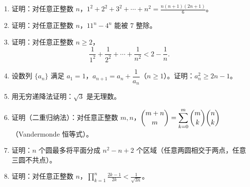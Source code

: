 \documentclass[12pt, a4paper]{ctexart}
\begin{document}
\begin{enumerate}[label=\textbf{题目\arabic*}]

\item 证明：对任意正整数 $n$，$\displaystyle 1^2 + 2^2 + 3^2 + \cdots + n^2 = \frac{n(n+1)(2n+1)}{6}$。

\item 证明：对任意正整数 $n$，$11^n - 4^n$ 能被 $7$ 整除。

\item 证明：对任意正整数 $n \geq 2$，
\[ \frac{1}{1^2} + \frac{1}{2^2} + \cdots + \frac{1}{n^2} < 2 - \frac{1}{n}. \]

\item 设数列 $\{a_n\}$ 满足 $a_1 = 1$，$a_{n+1} = a_n + \dfrac{1}{a_n}$（$n \geq 1$）。证明：$a_n^2 \geq 2n - 1$。

\item 用无穷递降法证明：$\sqrt{3}$ 是无理数。

\item 证明（二重归纳法）：对任意正整数 $m, n$，$\dbinom{m+n}{m} = \displaystyle\sum_{k=0}^{m}\binom{m}{k}\binom{n}{k}$（Vandermonde 恒等式）。

\item 证明：$n$ 个圆最多将平面分成 $n^2 - n + 2$ 个区域（任意两圆相交于两点，任意三圆不共点）。

\item 证明：对任意正整数 $n$，$\displaystyle\prod_{k=1}^{n}\frac{2k-1}{2k} < \frac{1}{\sqrt{3n}}$。

\end{enumerate}

\vspace{12pt}
\end{document}
